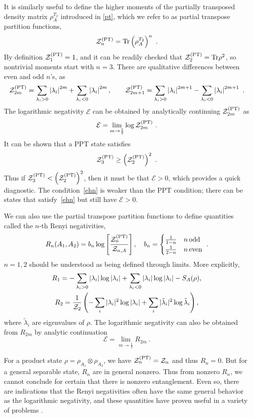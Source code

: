 \documentclass[a4paper,11pt]{article}
\newcommand\half{{\ensuremath{\frac{1}{2}}}}
\newcommand{\be}{\begin{equation}}
\newcommand{\ee}{\end{equation}}
\newcommand{\bega}{\begin{gather}}
\newcommand{\bca}{\begin{cases}}
\newcommand{\eca}{\end{cases}}
\newcommand\lam{\lambda}
\newcommand\ov{\over}
\newcommand\ha{{\half}}
\def\le{\left}
\def\ri{\right}
\newcommand\sE{{\ensuremath{{\mathcal E}}}}
\newcommand\sZ{{\mathcal Z}}
\newcommand{\Tr}{\text{Tr}}
\begin{document}
It is similarly useful to define the higher moments of the partially transposed density matrix $\rho_A^{T_2}$ introduced in \eqref{pt}, which we refer to as partial transpose partition functions, 
\be \label{repar}
\sZ_n^{(\rm PT)} = \Tr \left(\rho_A^{T_{2}}\right)^{n} \ .
\ee
By definition $\sZ_1^{(\rm PT)} =1$, and it can be readily checked that $\sZ_2^{(\rm PT)} = \Tr \rho^2$, so nontrivial moments start with $n=3$. There are qualitative differences between even and odd $n$'s, as 
\be
\sZ_{2m}^{(\rm PT)}=\sum_{\lambda_{i}>0}\left|\lambda_{i}\right|^{2m}+\sum_{\lambda_{i}<0}\left|\lambda_{i}\right|^{2m} , \qquad
\sZ_{2m+1}^{(\rm PT)}=\sum_{\lambda_{i}>0}\left|\lambda_{i}\right|^{2m+1}-\sum_{\lambda_{i}<0}\left|\lambda_{i}\right|^{2m+1} \ .
\ee
The logarithmic negativity $\sE$ can be obtained by analytically continuing $\sZ_{2m}^{(\rm PT)}$ as 
\be
\mathcal{E}=\lim _{m \rightarrow \ha} \log \sZ_{2m}^{(\rm PT)} \ . \label{limit_1}
\ee
It can be shown that a PPT state satisfies~\cite{elben2020mixed} 
\be \label{ehn}
\sZ_{3}^{(\rm PT)} \geq \le(\sZ_{2}^{(\rm PT)}\ri)^2 \ .
\ee
Thus if $\sZ_{3}^{(\rm PT)} < \le(\sZ_{2}^{(\rm PT)}\ri)^2$, then it must be that $\sE > 0$, which provides a quick diagnostic. 
The condition~\eqref{ehn} is weaker than the PPT condition; there can be states that satisfy~\eqref{ehn} but still have 
$\sE > 0$. 

We can also use the partial transpose partition functions to define quantities called the $n$-th Renyi negativities, 
 \be 
\label{rn}
R_n(A_1, A_2) = b_n \log \le[{\sZ_n^{(\rm PT)} \ov \sZ_{n,A}} \ri] , \quad b_n = \bca {1 \ov 1-n} & n \, {\rm odd} \cr {1 \ov 2-n} & n \, {\rm even} \eca \ .
\ee 
$n=1,2$ should be understood as being defined through limits. More explicitly, 
\bega 
R_1 = -\sum_{\lambda_{i}>0}|\lambda_{i}| \log |\lam_i| + \sum_{\lambda_{i}<0}|\lambda_{i}| \log |\lam_i| - S_{A}(\rho) , \\
R_2 ={1 \ov \sZ_2} \le( - \sum_i |\lambda_{i}|^2 \log |\lam_i| + \sum_{i}|\tilde \lambda_{i}|^2 \log \tilde \lam_i \ri),
\end{gather}
where $\tilde \lam_i$ are eigenvalues of $\rho$. 
The logarithmic negativity can also be obtained from $R_{2m}$ by analytic continuation 
\be 
\sE = \lim_{m \to \ha} R_{2m} \ . \label{limit_2}
\ee

For a product state $\rho = \rho_{A_1} \otimes \rho_{A_2}$, we have 
$\sZ_n^{(\rm PT)} = \sZ_n$ and thus $R_n =0$. But for a general separable state, $R_n$ are in general nonzero. 
 Thus from nonzero $R_n$, we cannot conclude for certain that there is nonzero entanglement. 
Even so, there are indications that the Renyi negativities often have the same general behavior as the logarithmic negativity, and these quantities have proven useful in a variety of problems \cite{2014PhRvB..90f4401C,2018PhRvL.121o0503G,2020PhRvL.125n0603W,2020PhRvL.125k6801L,2020PhRvB.102f4304W,2020arXiv200706305E,2020arXiv200811727L,2021arXiv211007384W}.
\end{document}
